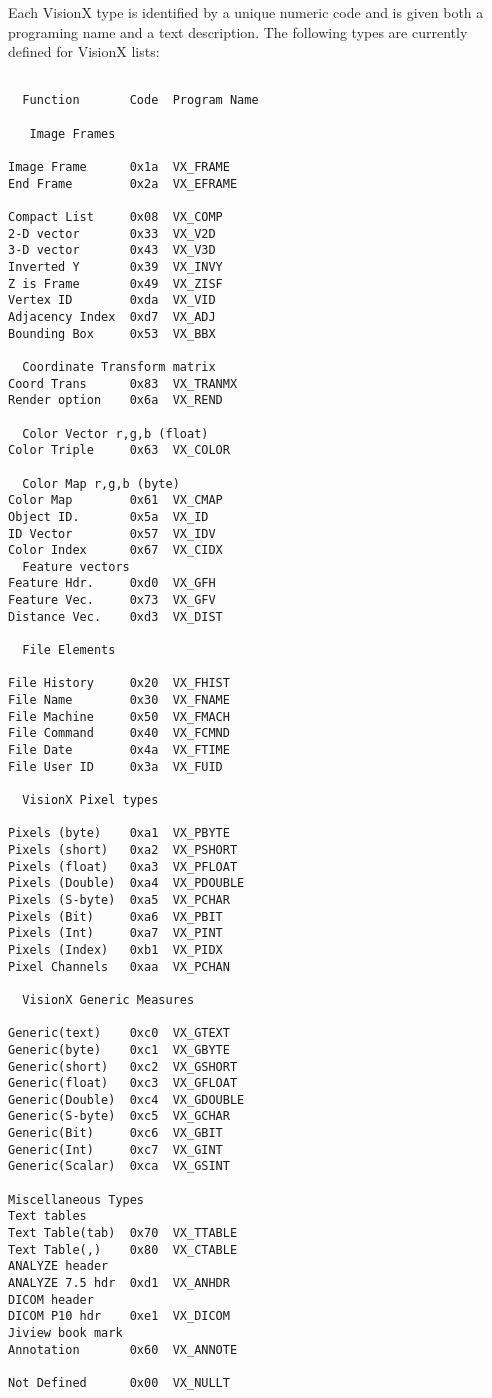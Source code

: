 Each VisionX type is identified by a unique numeric code
and is given both a programing name and a text description.
The following types are currently defined for VisionX lists:

\footnotesize{\begin{verbatim}

  Function       Code  Program Name 

   Image Frames

Image Frame      0x1a  VX_FRAME
End Frame        0x2a  VX_EFRAME

Compact List     0x08  VX_COMP
2-D vector       0x33  VX_V2D
3-D vector       0x43  VX_V3D
Inverted Y       0x39  VX_INVY
Z is Frame       0x49  VX_ZISF
Vertex ID        0xda  VX_VID
Adjacency Index  0xd7  VX_ADJ
Bounding Box     0x53  VX_BBX

  Coordinate Transform matrix
Coord Trans      0x83  VX_TRANMX
Render option    0x6a  VX_REND

  Color Vector r,g,b (float)
Color Triple     0x63  VX_COLOR

  Color Map r,g,b (byte)
Color Map        0x61  VX_CMAP
Object ID.       0x5a  VX_ID
ID Vector        0x57  VX_IDV
Color Index      0x67  VX_CIDX
  Feature vectors
Feature Hdr.     0xd0  VX_GFH
Feature Vec.     0x73  VX_GFV
Distance Vec.    0xd3  VX_DIST

  File Elements

File History     0x20  VX_FHIST
File Name        0x30  VX_FNAME
File Machine     0x50  VX_FMACH
File Command     0x40  VX_FCMND
File Date        0x4a  VX_FTIME
File User ID     0x3a  VX_FUID

  VisionX Pixel types

Pixels (byte)    0xa1  VX_PBYTE
Pixels (short)   0xa2  VX_PSHORT
Pixels (float)   0xa3  VX_PFLOAT
Pixels (Double)  0xa4  VX_PDOUBLE
Pixels (S-byte)  0xa5  VX_PCHAR
Pixels (Bit)     0xa6  VX_PBIT
Pixels (Int)     0xa7  VX_PINT
Pixels (Index)   0xb1  VX_PIDX
Pixel Channels   0xaa  VX_PCHAN

  VisionX Generic Measures

Generic(text)    0xc0  VX_GTEXT
Generic(byte)    0xc1  VX_GBYTE
Generic(short)   0xc2  VX_GSHORT
Generic(float)   0xc3  VX_GFLOAT
Generic(Double)  0xc4  VX_GDOUBLE
Generic(S-byte)  0xc5  VX_GCHAR
Generic(Bit)     0xc6  VX_GBIT
Generic(Int)     0xc7  VX_GINT
Generic(Scalar)  0xca  VX_GSINT

Miscellaneous Types
Text tables
Text Table(tab)  0x70  VX_TTABLE
Text Table(,)    0x80  VX_CTABLE
ANALYZE header
ANALYZE 7.5 hdr  0xd1  VX_ANHDR
DICOM header
DICOM P10 hdr    0xe1  VX_DICOM
Jiview book mark 
Annotation       0x60  VX_ANNOTE

Not Defined      0x00  VX_NULLT
\end{verbatim}}
